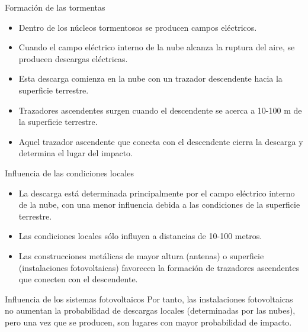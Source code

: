 \documentclass[aspectratio=169, usenames,svgnames,dvipsnames]{beamer}
\begin{document}
\begin{frame}[label={sec:org7fd8866}]{Formación de las tormentas}
\begin{itemize}
\item Dentro de los núcleos tormentosos se producen campos eléctricos.

\item Cuando el campo eléctrico interno de la nube alcanza la ruptura del
aire, se producen descargas eléctricas.

\item \alert{Esta descarga comienza en la nube} con un \alert{trazador descendente} hacia
la superficie terrestre.

\item Trazadores ascendentes surgen cuando el descendente se acerca a
10-100 m de la superficie terrestre.

\item Aquel trazador ascendente que conecta con el descendente cierra la
descarga y determina el lugar del impacto.
\end{itemize}
\end{frame}

\begin{frame}[label={sec:orgf3c74ce}]{Influencia de las condiciones locales}
\begin{itemize}
\item \alert{La descarga está determinada principalmente por el campo eléctrico
interno de la nube}, con una menor influencia debida a las
condiciones de la superficie terrestre.

\item Las \alert{condiciones locales sólo influyen} a distancias de 10-100 metros.

\item Las \alert{construcciones metálicas de mayor altura} (antenas) o superficie
(instalaciones fotovoltaicas) favorecen la formación de trazadores
ascendentes que conecten con el descendente.
\end{itemize}
\end{frame}

\begin{frame}[label={sec:org751853f}]{Influencia de los sistemas fotovoltaicos}
Por tanto, \alert{las instalaciones fotovoltaicas no aumentan la probabilidad
de descargas locales} (determinadas por las nubes), pero una vez que se
producen, son lugares con mayor probabilidad de impacto.
\end{frame}
\end{document}
